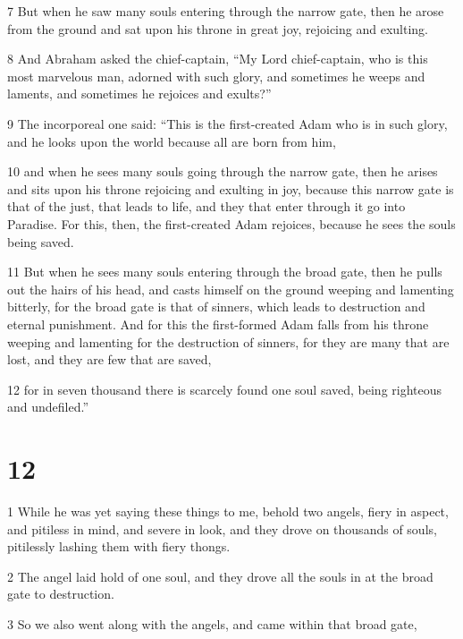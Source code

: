\par 7 But when he saw many souls entering through the narrow gate, then he arose from the ground and sat upon his throne in great joy, rejoicing and exulting. 

\par 8 And Abraham asked the chief-captain, “My Lord chief-captain, who is this most marvelous man, adorned with such glory, and sometimes he weeps and laments, and sometimes he rejoices and exults?” 

\par 9 The incorporeal one said: “This is the first-created Adam who is in such glory, and he looks upon the world because all are born from him, 

\par 10 and when he sees many souls going through the narrow gate, then he arises and sits upon his throne rejoicing and exulting in joy, because this narrow gate is that of the just, that leads to life, and they that enter through it go into Paradise. For this, then, the first-created Adam rejoices, because he sees the souls being saved. 

\par 11 But when he sees many souls entering through the broad gate, then he pulls out the hairs of his head, and casts himself on the ground weeping and lamenting bitterly, for the broad gate is that of sinners, which leads to destruction and eternal punishment. And for this the first-formed Adam falls from his throne weeping and lamenting for the destruction of sinners, for they are many that are lost, and they are few that are saved, 

\par 12 for in seven thousand there is scarcely found one soul saved, being righteous and undefiled.”

\chapter{12}

\par 1 While he was yet saying these things to me, behold two angels, fiery in aspect, and pitiless in mind, and severe in look, and they drove on thousands of souls, pitilessly lashing them with fiery thongs. 

\par 2 The angel laid hold of one soul, and they drove all the souls in at the broad gate to destruction. 

\par 3 So we also went along with the angels, and came within that broad gate, 

